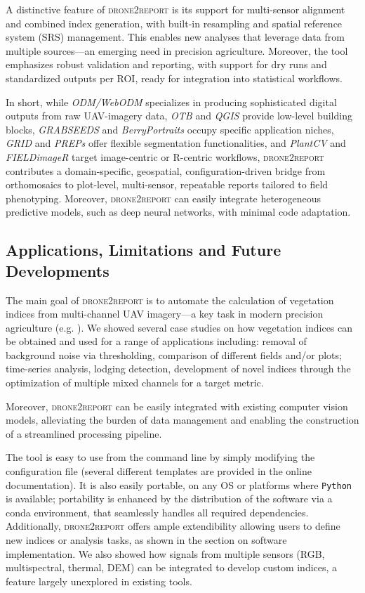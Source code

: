 \documentclass[drones,technicalnote,accept,pdftex,moreauthors]{Definitions/mdpi}
\begin{document}
A distinctive feature of \textsc{drone2report} is its support for multi-sensor alignment and combined index generation, with built-in resampling and spatial reference system (SRS) management. This enables new analyses that leverage data from multiple sources—an emerging need in precision agriculture. Moreover, the tool emphasizes robust validation and reporting, with support for dry runs and standardized outputs per ROI, ready for integration into statistical workflows.

In short, while \textit{ODM/WebODM} specializes in producing sophisticated digital outputs from raw UAV-imagery data, \textit{OTB} and \textit{QGIS} provide low-level building blocks, \textit{GRABSEEDS} and \textit{BerryPortraits} occupy specific application niches, \textit{GRID} and \textit{PREPs} offer flexible segmentation functionalities, and \textit{PlantCV} and \textit{FIELDimageR} target image-centric or R-centric workflows, \textsc{drone2report} contributes a domain-specific, geospatial, configuration-driven bridge from orthomosaics to plot-level, multi-sensor, repeatable reports tailored to field phenotyping. Moreover, \textsc{drone2report} can easily integrate heterogeneous predictive models, such as deep neural networks, with minimal code adaptation.

\subsection{Applications, Limitations and Future Developments}

The main goal of \textsc{drone2report} is to automate the calculation of vegetation indices from multi-channel UAV imagery—a key task in modern precision agriculture (e.g. \cite{candiago2015evaluating, radovcaj2023state, velez2023beyond}).
We showed several case studies on how vegetation indices can be obtained and used for a range of applications including: removal of background noise via thresholding, comparison of different fields and/or plots; time-series analysis, lodging detection, development of novel indices through the optimization of multiple mixed channels for a target metric. 

Moreover, \textsc{drone2report} can be easily integrated with existing computer vision models, alleviating the burden of data management and enabling the construction of a streamlined processing pipeline.

The tool is easy to use from the command line by simply modifying the configuration file (several different templates are provided in the online documentation). 
It is also easily portable, on any OS or platforms where \texttt{Python} is available; portability is enhanced by the distribution of the software via a conda environment, that seamlessly handles all required dependencies. 
Additionally, \textsc{drone2report} offers ample extendibility allowing users to define new indices or analysis tasks, as shown in the section on software implementation. We also showed how signals from multiple sensors (RGB, multispectral, thermal, DEM) can be integrated to develop custom indices, a feature largely unexplored in existing tools.
\end{document}
